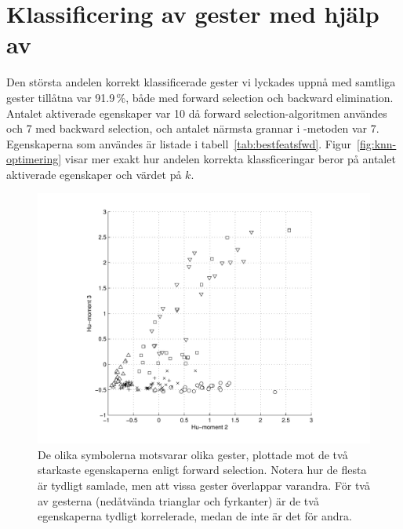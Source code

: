 \documentclass[../rapport_MVEX01-11-05]{subfiles}
\begin{document}
\section{Klassificering av gester med hjälp av \knn}
Den största andelen korrekt klassificerade gester vi lyckades uppnå
med samtliga gester tillåtna var 91.9\,\%, både med forward selection
och backward elimination. Antalet aktiverade
egenskaper var 10 då forward selection-algoritmen användes och 7 med
backward selection, och antalet närmsta grannar i \knn-metoden var 7. Egenskaperna som
användes är listade i
tabell~\vref{tab:bestfeatsfwd}. Figur~\vref{fig:knn-optimering} visar mer
exakt hur andelen korrekta
klassficeringar beror på antalet aktiverade egenskaper och värdet på $k$.

\begin{figure}[tbp]
  \centering
  \includegraphics[width=\textwidth,trim=2cm 0.5cm 2cm 0,clip=true]{bilder/feats-10+11}
  \caption{De olika symbolerna motsvarar olika gester, plottade mot de två starkaste egenskaperna
  enligt forward selection. Notera hur de flesta är tydligt samlade, men att
	vissa gester överlappar varandra. För två av gesterna (nedåtvända trianglar och fyrkanter) 
	är de två egenskaperna tydligt korrelerade, medan de inte är det för andra.}
  \label{fig:feats1011}
\end{figure}
\end{document}
